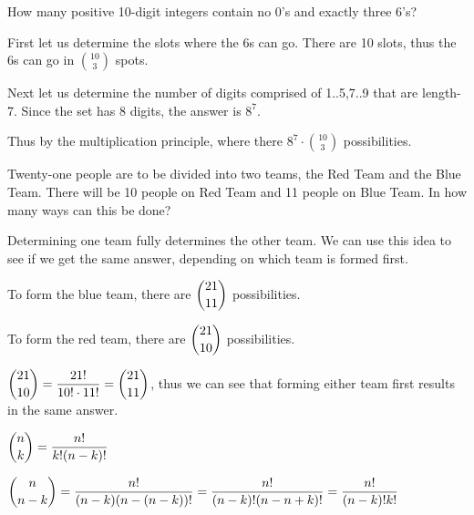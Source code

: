 \documentclass[openany, 11pt]{book}
\begin{document}
\begin{exercise}{}{}
	How many positive 10-digit integers contain no 0's and exactly three 6's?
	\begin{alist}
		\item First let us determine the slots where the 6s can go. There are 10 slots,
		thus the 6s can go in $\binom{10}{3}$ spots.
		\item Next let us determine the number of digits comprised of 1..5,7..9 that
		are length-7. Since the set has 8 digits, the answer is $8^7$.
		\item Thus by the multiplication principle, where there
		$8^{7}\cdot\binom{10}{3}$ possibilities.
	\end{alist}
\end{exercise}

\begin{exercise}{}{}
	Twenty-one people are to be divided into two teams, the
	Red Team and the Blue Team. There will be 10 people on Red Team and 11
	people on Blue Team. In how many ways can this be done?
	\begin{alist}
		\item Determining one team fully determines the other team. We can use this idea
		to see if we get the same answer, depending on which team is formed first.
		\item To form the blue team, there are $\dbinom{21}{11}$ possibilities.
		\item To form the red team, there are $\dbinom{21}{10}$ possibilities.
		\item $\dbinom{21}{10} = \dfrac{21!}{10!\cdot11!} = \dbinom{21}{11}$, thus we
		can see that forming either team first results in the same answer.
	\end{alist}
\end{exercise}

\begin{exercise}{}{}
	\begin{alist}
		\item $\dbinom{n}{k}=\dfrac{n!}{k!(n-k)!}$
		\item $\dbinom{n}{n-k}=\dfrac{n!}{(n-k)(n-(n-k))!}=\dfrac{n!}{(n-k)!(n-n+k)!}=\dfrac{n!}{(n-k)!k!}$
	\end{alist}
\end{exercise}
\end{document}
